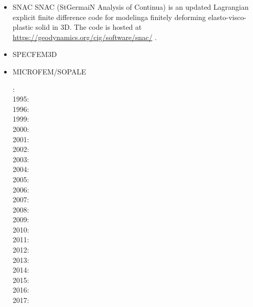 \begin{itemize}
\cite{kaus05}
\cite{kasb08}

\item SNAC 
SNAC (StGermaiN Analysis of Continua) is an updated Lagrangian explicit finite 
difference code for modelinga finitely deforming elasto-visco-plastic solid in 3D.
The code is hosted at \url{https://geodynamics.org/cig/software/snac/} .

\cite{chlg08}
\cite{chgu08}
\cite{qula10}
\cite{chss11}

\item SPECFEM3D 

\cite{kott05}

\item MICROFEM/SOPALE 

: \cite{wibe94}\cite{befh94}\cite{bequ94}\\
1995: \cite{full95}\cite{elfb95}\\
1996: \cite{bekh96}\\
1999: \cite{will99a}\cite{will99b}\\
2000: \cite{pybf00}\cite{bemh00}\\
2001: \cite{bejn01}\\
2002: \cite{hube02}\cite{pybf02}\\
2003: \cite{hube03}\cite{vamf03}\cite{wipo03}\cite{pymi03}\cite{bupf03}\cite{wiep03}\\
2004: \cite{bejn04}\cite{pycr04}\cite{pybe04}\cite{elsp04}\cite{geim04}\\
2005: \cite{gebi05}\cite{hubb05}\\
2006: \cite{pysk06}\cite{selz06}\cite{pabs06}\\
2007: \cite{hube07}\cite{cubh07}\cite{mohb07}\cite{sebp07}\\
2008: \cite{sebp08}\cite{wabj08}\cite{wabj08b}\cite{gopy08}\cite{buhb08}\cite{hube08}\\
2009: \cite{kecw09}\cite{bejb09}\cite{bupb09}\cite{grba09}\cite{sihb09}\\
2010: \cite{albs10}\cite{albe10}\cite{grpy10}\cite{pygp10}\\
2011: \cite{cube11}\cite{bubj11}\cite{hube11}\\
2012: \cite{grpy12}\cite{grpy12b}\cite{kogp12}\cite{grbe12}\cite{jahu12}\\
2013: \cite{bubj13}\cite{chbe13}\cite{fihv13a}\cite{fihv13b}\cite{gobi13}\cite{grpy13}
      \cite{knak13}\cite{nipc13}\cite{jahm13}\cite{krcu13}\\
2014: \cite{gogu14}\\
2015: \cite{albe15}\cite{bubj15}\cite{heps15}\\
2016: \cite{licu16}\\
2017: \cite{bube17}



\end{itemize}
